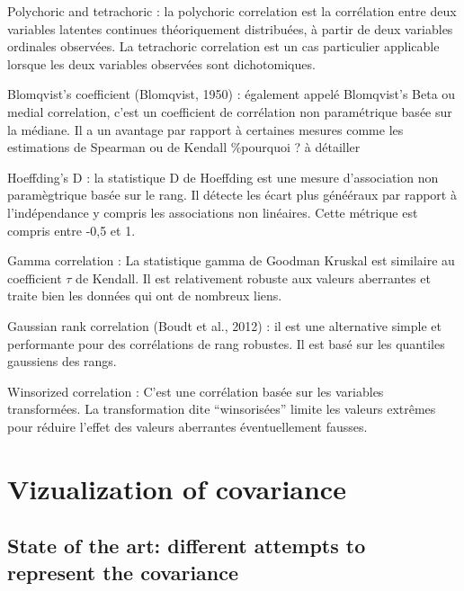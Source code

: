 \documentclass[
]{report}
\begin{document}
\item

Polychoric and tetrachoric : la polychoric correlation est la corrélation entre deux variables latentes continues théoriquement distribuées, à partir de deux variables ordinales observées. La tetrachoric correlation est un cas particulier applicable lorsque les deux variables observées sont dichotomiques.

\item

Blomqvist's coefficient (Blomqvist, 1950) : également appelé Blomqvist's Beta ou medial correlation, c'est un coefficient de corrélation non paramétrique basée sur la médiane. Il a un avantage par rapport à certaines mesures comme les estimations de Spearman ou de Kendall \%pourquoi ? à détailler

\item

Hoeffding's D : la statistique D de Hoeffding est une mesure d'association non paramègtrique basée sur le rang. Il détecte les écart plus génééraux par rapport à l'indépendance y compris les associations non linéaires. Cette métrique est compris entre -0,5 et 1.

\item

Gamma correlation : La statistique gamma de Goodman Kruskal est similaire au coefficient \(\tau\) de Kendall. Il est relativement robuste aux valeurs aberrantes et traite bien les données qui ont de nombreux liens.

\item

Gaussian rank correlation (Boudt et al., 2012) : il est une alternative simple et performante pour des corrélations de rang robustes. Il est basé sur les quantiles gaussiens des rangs.

\item

Winsorized correlation : C'est une corrélation basée sur les variables transformées. La transformation dite ``winsorisées'' limite les valeurs extrêmes pour réduire l'effet des valeurs aberrantes éventuellement fausses.

\hypertarget{vizualization-of-covariance}{%
\chapter{Vizualization of covariance}\label{vizualization-of-covariance}}

\hypertarget{state-of-the-art-different-attempts-to-represent-the-covariance}{%
\section{State of the art: different attempts to represent the covariance}\label{state-of-the-art-different-attempts-to-represent-the-covariance}}
\end{document}
